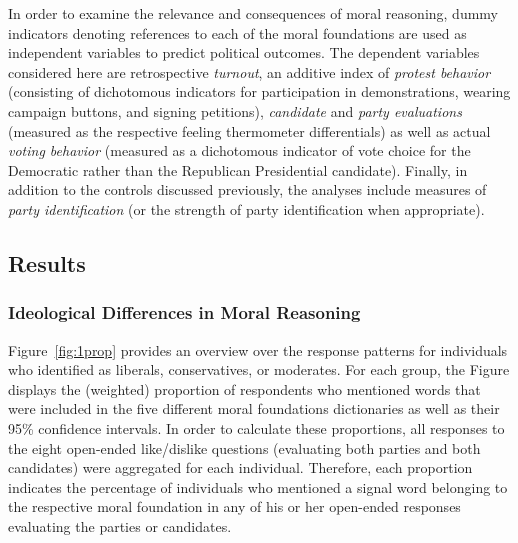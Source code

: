 \documentclass[12pt]{article}
\begin{document}
In order to examine the relevance and consequences of moral reasoning, dummy indicators denoting references to each of the moral foundations are used as independent variables to predict political outcomes. The dependent variables considered here are retrospective \textit{turnout}, an additive index of \textit{protest behavior} (consisting of dichotomous indicators for participation in demonstrations, wearing campaign buttons, and signing petitions), \textit{candidate} and \textit{party evaluations} (measured as the respective feeling thermometer differentials) as well as actual \textit{voting behavior} (measured as a dichotomous indicator of vote choice for the Democratic rather than the Republican Presidential candidate). Finally, in addition to the controls discussed previously, the analyses include measures of \textit{party identification} (or the strength of party identification when appropriate).


\subsection{Results}

\subsubsection{Ideological Differences in Moral Reasoning}

Figure~\ref{fig:1prop} provides an overview over the response patterns for individuals who identified as liberals, conservatives, or moderates. For each group, the Figure displays the (weighted) proportion of respondents who mentioned words that were included in the five different moral foundations dictionaries as well as their 95\% confidence intervals. In order to calculate these proportions, all responses to the eight open-ended like/dislike questions (evaluating both parties and both candidates) were aggregated for each individual. Therefore, each proportion indicates the percentage of individuals who mentioned a signal word belonging to the respective moral foundation in any of his or her open-ended responses evaluating the parties or candidates.
\end{document}
